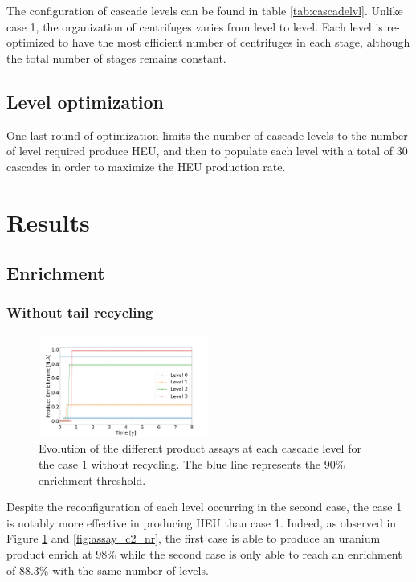 \documentclass{anstrans}
\begin{document}
The configuration of cascade levels can be found in table
\ref{tab:cascadelvl}. Unlike case 1, the organization of centrifuges varies from
level to level. Each level is re-optimized to have the most efficient number of
centrifuges in each stage, although the total number of stages remains constant.


\subsection{Level optimization}

One last round of optimization limits the number of cascade levels to the number
of level required produce HEU, and then to populate each level with a total of
30 cascades in order to maximize the HEU production rate.

\section{Results}
\subsection{Enrichment}
\subsubsection{Without tail recycling}

\begin{figure}[ht] %
  \centering
  \includegraphics[width=0.5\textwidth]{assay_case_1_no_rec.png}
  \caption{Evolution of the different product assays at each cascade level for
  the case 1 without recycling. The blue line represents the $90\%$ enrichment
  threshold.}\label{fig:assay_c1_nr}
\end{figure}
Despite the reconfiguration of each level occurring in the second case, the case
1 is notably more effective in producing HEU than case 1. Indeed, as observed in
Figure \ref{fig:assay_c1_nr} and \ref{fig:assay_c2_nr}, the first case is able
to produce an uranium product enrich at $98\%$ while the second case is only
able to reach an enrichment of $88.3\%$ with the same number of levels.
\end{document}
